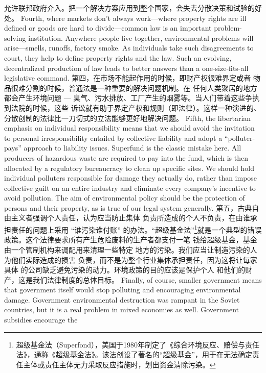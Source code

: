 \begin{paracol}{2}
允许联邦政府介入。把一个解决方案应用到整个国家，会失去分散决策和试验的好处。
\switchcolumn*
Fourth, where markets don't always work---where property
rights are ill defined or goods are hard to divide---common law
is an important problem-solving institution. Anywhere people
live together, environmental problems will arise---smells, runoffs, factory smoke. As individuals take such disagreements to
court, they help to define property rights and the law. Such an evolving, decentralized production of law leads to better answers than a one-size-fits-all legislative command.
\switchcolumn
第四，在市场不能起作用的时候，即财产权很难界定或者
物品很难分割的时候，普通法是一种重要的解决问题机制。在
任何人类聚居的地方都会产生环境问题 --- 臭气、污水排放、工厂产生的烟雾等。当人们带着这些争执到法院的时候，这些
诉讼就有助于界定产权和规则（即法律）。这样一种演进的、
分散创制的法律比一刀切式的立法能够更好地解决问题。
\switchcolumn*
Fifth, the libertarian emphasis on individual responsibility
means that we should avoid the invitation to personal irresponsibility entailed by collective liability and adopt a ``polluter-pays'' approach to liability issues. Superfund is the classic
mistake here. All producers of hazardous waste are required to
pay into the fund, which is then allocated by a regulatory bureaucracy to clean up specific sites. We should hold individual
polluters responsible for damage they actually do, rather than
impose collective guilt on an entire industry and eliminate
every company's incentive to avoid pollution. The aim of environmental policy should be the protection of persons and their
property, as is true of our legal system generally.
\switchcolumn
第五，古典自由主义者强调个人责任，认为应当防止集体
负责所造成的个人不负责，在由谁承担责任的问题上采用
“谁污染谁付账” 的办法。“超级基金法”\footnote{超级基金法（Superfond），美国于1980年制定了《综合环境反应、赔偿与责任法》，通称《超级基金法》。该法创设了著名的“超级基金”，用于在无法确定责任主体或责任主体无力采取反应措施时，划出资金淸除污染。}就是一个典型的错误政策。这个法律要求所有产生危险废料的生产者都支付一笔
钱给超级基金，基金由一个管制机构来调配用来清理一些特定
地方的污染。我们应当让制造污染的人为他们实际造成的损害
负责，而不是为整个行业集体承担责任，因为这将让每家具体
的公司缺乏避免污染的动力。环境政策的目的应该是保护个人
和他们的财产，这是我们法律制度的总体目标。
\switchcolumn*
Finally, of course, smaller government means that government itself would stop polluting and encouraging environmental damage. Government environmental destruction was
rampant in the Soviet countries, but it is a real problem in
mixed economies as well. Government subsidies encourage the

\end{paracol}
